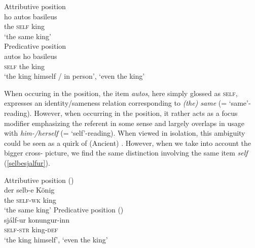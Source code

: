 \documentclass[output=paper,colorlinks,citecolor=brown]{langscibook}
\begin{document}
\begin{multicols}{2}{
\begin{exe}
  \ex  \label{selbo}
     \begin{xlist}
       \ex  Attributive position \\
        \gll ho  autos basileus \\  
            the \textsc{self}   king   \\ 
            \glt `the same king'             \\
        \ex  Predicative position \\ 
         \gll   autos ho basileus  \\ 
         \textsc{self}  the  king  \\
         \glt `the king himself / in person', `even the king'             
     \end{xlist}
\end{exe}}
\end{multicols} 

When occuring in the  position, the item \textit{autos}, here simply glossed as \textsc{self}, expresses an identity/sameness relation corresponding to  \textit{(the) same} (= `same'-reading). However, when occurring in the  position, it rather acts as a focus modifier emphasizing the referent in some sense and largely overlaps in usage with  \textit{him-/herself} (= `self'-reading). When viewed in isolation, this ambiguity could be seen as a quirk of (Ancient) . However, when we take into account the bigger cross- picture, we find the same distinction involving the same item \textit{self} (\ref{selbesjalfur}). %


\begin{multicols}{2}{
\begin{exe}
  \ex  \label{selbesjalfur}
     \begin{xlist}
       \ex  Attributive position  \hfill () \\
       \gll der selb-e König  \\ 
           the   \textsc{self-wk} king     \\ 
           \glt `the same king'             
       \ex  Predicative position  \hfill () \\
        \gll  sjálf-ur konungur-inn  \\  
         \textsc{self-str}  king-\textsc{def} \\ 
        \glt  `the king himself', `even the king'              
     \end{xlist}
\end{exe}}
\end{multicols}
\end{document}
